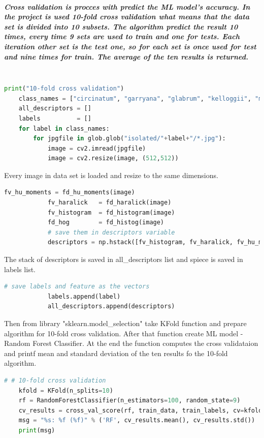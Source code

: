 \documentclass[12pt]{article}
\begin{document}
\subparagraph{
Cross validation is procces with predict the ML model's accuracy. In the project is used 10-fold cross validation what means that the data set is divided into 10 subsets. The algorithm predict the result 10 times, every time 9 sets are used to train and one for tests. Each iteration other set is the test one, so for each set is once used for test and nine times for train. The average of the ten results is returned.\\\\
}

\begin{lstlisting}[language=Python]
    print("10-fold cross validation")
    class_names = ["circinatum", "garryana", "glabrum", "kelloggii", "macrophyllum","negundo"]
    all_descriptors = []
    labels          = []
    for label in class_names:
        for jpgfile in glob.glob("isolated/"+label+"/*.jpg"):
            image = cv2.imread(jpgfile)
            image = cv2.resize(image, (512,512))
\end{lstlisting} 

Every image in data set is loaded and resize to the same dimensions. 

\begin{lstlisting}[language=Python]
            fv_hu_moments = fd_hu_moments(image)
            fv_haralick   = fd_haralick(image)
            fv_histogram  = fd_histogram(image)
            fd_hog        = fd_histog(image)
            # save them in descriptors variable
            descriptors = np.hstack([fv_histogram, fv_haralick, fv_hu_moments, fd_hog])
\end{lstlisting} 

The stack of descriptors is saved in all\_descriptors list and spiece is saved in labels list.

\begin{lstlisting}[language=Python]
            # save labels and feature as the vectors
            labels.append(label)
            all_descriptors.append(descriptors)
\end{lstlisting} 

Then from library "sklearn.model\_selection" take KFold function and prepare algorithm for 10-fold cross validation.
After that function create ML model - Random Forest Classifier. At the end the function computes the cross validataion and printf mean and standard deviation of the ten results fo the 10-fold algorithm.

\begin{lstlisting}[language=Python]
    # # 10-fold cross validation
    kfold = KFold(n_splits=10)
    rf = RandomForestClassifier(n_estimators=100, random_state=9)
    cv_results = cross_val_score(rf, train_data, train_labels, cv=kfold, scoring="accuracy")
    msg = "%s: %f (%f)" % ('RF', cv_results.mean(), cv_results.std())
    print(msg)
\end{lstlisting}  
\end{document}
